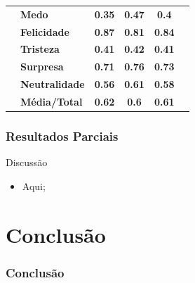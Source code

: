 \documentclass{beamer}
\begin{document}
\begin{frame}
\begin{table}[]
\begin{tabular}{llcccc}
                                       & \textbf{Medo}         & \textbf{0.35}                         & \textbf{0.47}                          & \textbf{0.4}                          &                                       \\
                                       & \textbf{Felicidade}   & \textbf{0.87}                         & \textbf{0.81}                          & \textbf{0.84}                         &                                       \\
                                       & \textbf{Tristeza}     & \textbf{0.41}                         & \textbf{0.42}                          & \textbf{0.41}                         &                                       \\
                                       & \textbf{Surpresa}     & \textbf{0.71}                         & \textbf{0.76}                          & \textbf{0.73}                         &                                       \\
                                       & \textbf{Neutralidade} & \textbf{0.56}                         & \textbf{0.61}                          & \textbf{0.58}                         &                                       \\
                                       & \textbf{Média/Total}  & \textbf{0.62}                         & \textbf{0.6}                           & \textbf{0.61}                         &                                       \\ \hline
\end{tabular}
\end{table}
\end{frame}


\begin{frame}
\frametitle{Resultados Parciais}
 \begin{block}{Discussão}
\begin{itemize}
\pause
\item Aqui;

\end{itemize}
\end{block}
\end{frame}


\section{Conclusão}
\begin{frame}
\frametitle{Conclusão}

\end{frame}
\end{document}
